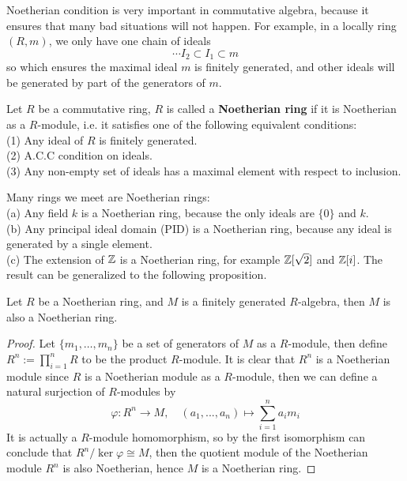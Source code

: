 Noetherian condition is very important in commutative algebra, because it ensures that many bad situations will not happen. For example, in a locally ring \((R,m)\), we only have one chain of ideals 
\[\cdots I_2 \subset I_1 \subset m\]
so which ensures the maximal ideal \(m\) is finitely generated, and other ideals will be generated by part of the generators of \(m\).

\begin{definition}
    Let \(R\) be a commutative ring, \(R\) is called a \textbf{Noetherian ring} if it is Noetherian as a \(R\)-module, i.e. it satisfies one of the following equivalent conditions:\\
    (1) Any ideal of \(R\) is finitely generated.\\
    (2) A.C.C condition on ideals.\\
    (3) Any non-empty set of ideals has a maximal element with respect to inclusion.
\end{definition}
\begin{remark}
    Many rings we meet are Noetherian rings:\\

    (a) Any field \(k\) is a Noetherian ring, because the only ideals are \(\{0\}\) and \(k\).\\

    (b) Any principal ideal domain (PID) is a Noetherian ring, because any ideal is generated by a single element.\\

    (c) The extension of \(\mathbb{Z}\) is a Noetherian ring, for example 
    \(\mathbb{Z}[\sqrt{2}]\) and \(\mathbb{Z}[i]\). The result can be generalized to the following proposition.\\
\end{remark}

\begin{proposition}
    Let \(R\) be a Noetherian ring, and \(M\) is a finitely generated \(R\)-algebra, then \(M\) is also a Noetherian ring.
\end{proposition}
\begin{proof}
    Let \(\{m_1,\dots ,m_n\}\) be a set of generators of \(M\) as a \(R\)-module, then define  \(R^n := \prod_{i=1}^n R\) to be the product \(R\)-module. It is clear that \(R^n\) is a Noetherian module since \(R\) is a Noetherian module as a \(R\)-module, then we can define a natural surjection of \(R\)-modules by
    \[\varphi: R^n \to M, \quad (a_1,...,a_n) \mapsto \sum_{i=1}^{n} a_i m_i\]
    It is actually a \(R\)-module homomorphism, so by the first isomorphism can conclude that \(R^n/\ker \varphi \cong M\), then the quotient module of the Noetherian module \(R^n\) is also Noetherian, hence \(M\) is a Noetherian ring.
\end{proof}

